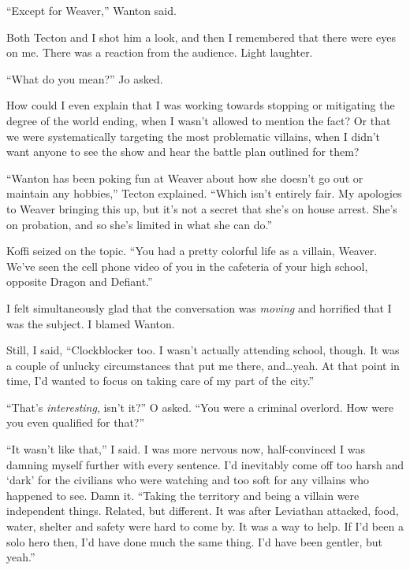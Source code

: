 ``Except for Weaver,'' Wanton said.



Both Tecton and I shot him a look, and then I remembered that there were eyes on me.  There was a reaction from the audience.  Light laughter.



``What do you mean?'' Jo asked.



How could I even explain that I was working towards stopping or mitigating the degree of the world ending, when I wasn't allowed to mention the fact?  Or that we were systematically targeting the most problematic villains, when I didn't want anyone to see the show and hear the battle plan outlined for them?



``Wanton has been poking fun at Weaver about how she doesn't go out or maintain any hobbies,'' Tecton explained.  ``Which isn't entirely fair.  My apologies to Weaver bringing this up, but it's not a secret that\emph{ }she's on house arrest.  She's on probation, and so she's limited in what she can do.''



Koffi seized on the topic.  ``You had a pretty colorful life as a villain, Weaver.  We've seen the cell phone video of you in the cafeteria of your high school, opposite Dragon and Defiant.''



I felt simultaneously glad that the conversation was \emph{moving} and horrified that I was the subject.  I blamed Wanton.



Still, I said, ``Clockblocker too.  I wasn't actually attending school, though.  It was a couple of unlucky circumstances that put me there, and\ldots yeah.  At that point in time, I'd wanted to focus on taking care of my part of the city.''



``That's \emph{interesting}, isn't it?'' O asked.  ``You were a criminal overlord.  How were you even qualified for that?''



``It wasn't like that,'' I said.  I was more nervous now, half-convinced I was damning myself further with every sentence.  I'd inevitably come off too harsh and `dark' for the civilians who were watching and too soft for any villains who happened to see.  Damn it.  ``Taking the territory and being a villain were independent things.  Related, but different.  It was after Leviathan attacked, food, water, shelter and safety were hard to come by.  It was a way to help.  If I'd been a solo hero then, I'd have done much the same thing.  I'd have been gentler, but yeah.''



